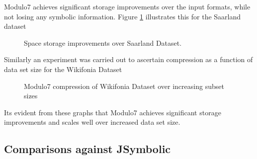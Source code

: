 \documentclass{article}
\begin{document}
Modulo7 achieves significant storage improvements over the input formats, while not losing any symbolic information. Figure \ref{fig:storageimprovement} illustrates this for the Saarland dataset \cite{saarlandmsd} \\

\begin{figure}[h]
\begin{center}
{}
 \caption{Space storage improvements over Saarland Dataset.}
 \label{fig:storageimprovement}
\end{center}
\end{figure}

\noindent Similarly an experiment was carried out to ascertain compression as a function of data set size for the Wikifonia Dataset \cite{WikifoniaDataset}

\begin{figure}[h]
\begin{center}
{}
 \caption{Modulo7 compression of Wikifonia Dataset over increasing subset sizes}
 \label{fig:compression}
\end{center}
\end{figure}

\noindent Its evident from these graphs that Modulo7 achieves significant storage improvements and scales well over increased data set size.   

\subsection{Comparisons against JSymbolic}
\end{document}
